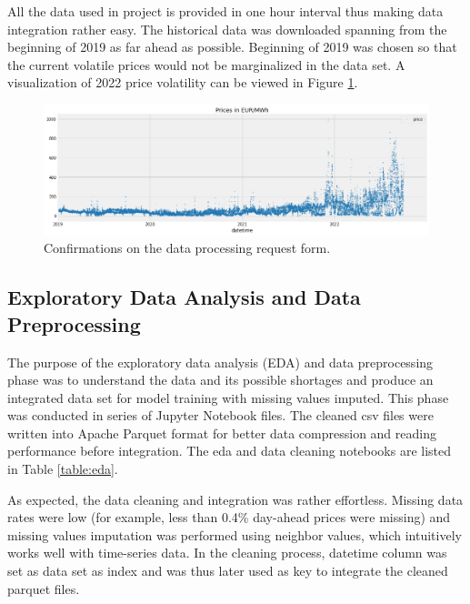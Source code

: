 \documentclass{article}
\begin{document}
All the data used in project is provided in one hour interval thus making data integration rather easy. The historical data was downloaded spanning from the beginning of 2019 as far ahead as possible. Beginning of 2019 was chosen so that the current volatile prices would not be marginalized in the data set. A visualization of 2022 price volatility can be viewed in Figure \ref{fig:prices-history}.

\begin{figure}[ht] 
\centering
\includegraphics[width=\textwidth]{report/images/day-ahead-prices.png}
\caption{Confirmations on the data processing request form.}
\label{fig:prices-history} 
\end{figure}

\subsection{Exploratory Data Analysis and Data Preprocessing}
\label{subsection:eda}

The purpose of the exploratory data analysis (EDA) and data preprocessing phase was to understand the data and its possible shortages and produce an integrated data set for model training with missing values imputed. This phase was conducted in series of Jupyter Notebook files. The cleaned csv files were written into Apache Parquet format for better data compression and reading performance before integration. The eda and data cleaning notebooks are listed in Table \ref{table:eda}.

As expected, the data cleaning and integration was rather effortless. Missing data rates were low (for example, less than 0.4\% day-ahead prices were missing) and missing values imputation was performed using neighbor values, which intuitively works well with time-series data. In the cleaning process, datetime column was set as data set as index and was thus later used as key to integrate the cleaned parquet files.
\end{document}
